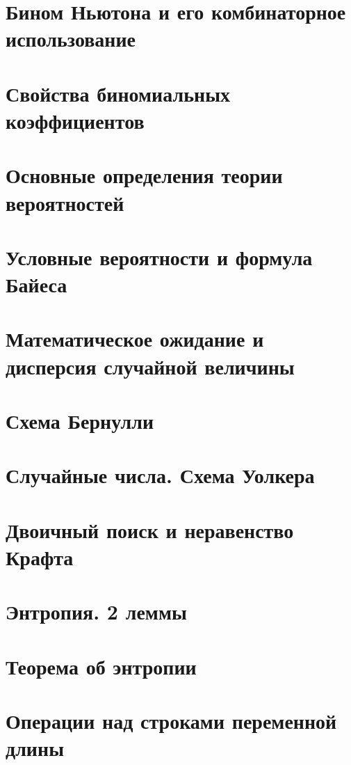 \documentclass[12pt, fleqn]{article}
\begin{document}
\section{Бином Ньютона и его комбинаторное использование}


\section{Свойства биномиальных коэффициентов}


\section{Основные определения теории вероятностей}


\section{Условные вероятности и формула Байеса}


\section{Математическое ожидание и дисперсия случайной величины}


\section{Схема Бернулли}


\section{Случайные числа. Схема Уолкера}


\section{Двоичный поиск и неравенство Крафта}


\section{Энтропия. 2 леммы}


\section{Теорема об энтропии}


\section{Операции над строками переменной длины}
\end{document}
